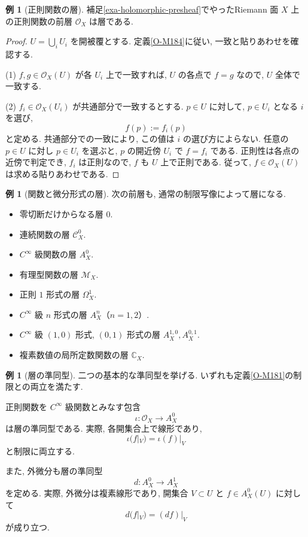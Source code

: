 \documentclass[dvipdfmx,a4paper,11pt]{article} %
\newcommand{\C}{\mathbb{C}}
\theoremstyle{definition}
\numberwithin{equation}{section}
\newtheorem{exa}[thm]{例}
\begin{document}
\begin{exa}[正則関数の層]\label{O-M185}
補足\ref{exa-holomorphic-presheaf}でやったRiemann 面 $X$ 上の正則関数の前層 $\mathcal O_X$ は層である.
\end{exa}

\begin{proof}
$U=\bigcup_i U_i$ を開被覆とする.
定義\ref{O-M184}に従い, 一致と貼りあわせを確認する.

(1) $f,g\in\mathcal O_X(U)$ が各 $U_i$ 上で一致すれば, 
$U$ の各点で $f=g$ なので, $U$ 全体で一致する.

(2) $f_i\in\mathcal O_X(U_i)$ が共通部分で一致するとする.
$p\in U$ に対して, $p\in U_i$ となる $i$ を選び, 
\[
f(p):=f_i(p)
\]
と定める.
共通部分での一致により, この値は $i$ の選び方によらない.
任意の $p\in U$ に対し $p\in U_i$ を選ぶと, $p$ の開近傍 $U_i$ で $f=f_i$ である. 正則性は各点の近傍で判定でき, $f_i$ は正則なので, $f$ も $U$ 上で正則である.
従って, $f\in\mathcal O_X(U)$ は求める貼りあわせである.
\end{proof}

\begin{exa}[関数と微分形式の層]
次の前層も, 通常の制限写像によって層になる.
\begin{itemize}
\item 零切断だけからなる層 $0$.
\item 連続関数の層 $\mathcal C_X^0$.
\item $C^\infty$ 級関数の層 $A_X^0$.
\item 有理型関数の層 $\mathcal M_X$.
\item 正則 $1$ 形式の層 $\Omega_X^1$.
\item $C^\infty$ 級 $n$ 形式の層 $A_X^n$（$n=1,2$）.
\item $C^\infty$ 級 $(1,0)$ 形式, $(0,1)$ 形式の層
$A_X^{1,0},A_X^{0,1}$.
\item 複素数値の局所定数関数の層 $\C_X$.
\end{itemize}

\end{exa}


\begin{exa}[層の準同型]
二つの基本的な準同型を挙げる. いずれも定義\ref{O-M181}の制限との両立を満たす.

正則関数を $C^\infty$ 級関数とみなす包含
\[
\iota:\mathcal O_X\longrightarrow A_X^0
\]
は層の準同型である.
実際, 各開集合上で線形であり, 
\[
\iota(f|_V)=\iota(f)|_V
\]
と制限に両立する.

また, 外微分も層の準同型
\[
d:A_X^0\longrightarrow A_X^1
\]
を定める.
実際, 外微分は複素線形であり, 
開集合 $V\subset U$ と $f\in A_X^0(U)$ に対して
\[
d(f|_V)=(df)|_V
\]
が成り立つ.
\end{exa}
\end{document}
